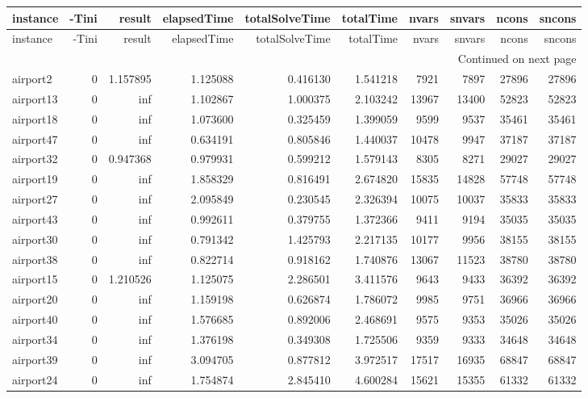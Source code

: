 \begin{longtable}{|l|r|r|r|r|r|r|r|r|r|}
\toprule
instance & -Tini & result & elapsedTime & totalSolveTime & totalTime & nvars & snvars & ncons & sncons \\
\midrule
\endfirsthead
\toprule
instance & -Tini & result & elapsedTime & totalSolveTime & totalTime & nvars & snvars & ncons & sncons \\
\midrule
\endhead
\midrule
\multicolumn{10}{r}{Continued on next page} \\
\midrule
\endfoot
\bottomrule
\endlastfoot
airport2 & 0 & 1.157895 & 1.125088 & 0.416130 & 1.541218 & 7921 & 7897 & 27896 & 27896 \\
airport13 & 0 & inf & 1.102867 & 1.000375 & 2.103242 & 13967 & 13400 & 52823 & 52823 \\
airport18 & 0 & inf & 1.073600 & 0.325459 & 1.399059 & 9599 & 9537 & 35461 & 35461 \\
airport47 & 0 & inf & 0.634191 & 0.805846 & 1.440037 & 10478 & 9947 & 37187 & 37187 \\
airport32 & 0 & 0.947368 & 0.979931 & 0.599212 & 1.579143 & 8305 & 8271 & 29027 & 29027 \\
airport19 & 0 & inf & 1.858329 & 0.816491 & 2.674820 & 15835 & 14828 & 57748 & 57748 \\
airport27 & 0 & inf & 2.095849 & 0.230545 & 2.326394 & 10075 & 10037 & 35833 & 35833 \\
airport43 & 0 & inf & 0.992611 & 0.379755 & 1.372366 & 9411 & 9194 & 35035 & 35035 \\
airport30 & 0 & inf & 0.791342 & 1.425793 & 2.217135 & 10177 & 9956 & 38155 & 38155 \\
airport38 & 0 & inf & 0.822714 & 0.918162 & 1.740876 & 13067 & 11523 & 38780 & 38780 \\
airport15 & 0 & 1.210526 & 1.125075 & 2.286501 & 3.411576 & 9643 & 9433 & 36392 & 36392 \\
airport20 & 0 & inf & 1.159198 & 0.626874 & 1.786072 & 9985 & 9751 & 36966 & 36966 \\
airport40 & 0 & inf & 1.576685 & 0.892006 & 2.468691 & 9575 & 9353 & 35026 & 35026 \\
airport34 & 0 & inf & 1.376198 & 0.349308 & 1.725506 & 9359 & 9333 & 34648 & 34648 \\
airport39 & 0 & inf & 3.094705 & 0.877812 & 3.972517 & 17517 & 16935 & 68847 & 68847 \\
airport24 & 0 & inf & 1.754874 & 2.845410 & 4.600284 & 15621 & 15355 & 61332 & 61332 \\

\end{longtable}
